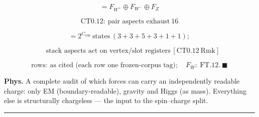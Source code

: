 \begin{theorem}
\[
= F_{W^+}\oplus F_{W^-}\oplus F_Z
\]

\[
\mathrm{CT0.12}:\ \text{pair aspects exhaust}\ 16
\]

\[
= 2^{C_{\mathrm{cap}}}\ \text{states}\ (3{+}3{+}5{+}3{+}1{+}1);
\]

\[
\quad\text{stack aspects act on vertex/slot registers}\ [\mathrm{CT0.12\ Rmk}]
\]

\[
\text{rows}:\ \text{as cited (each row one frozen-corpus tag)};\quad F_W:\ \mathrm{FT.12}.\ \blacksquare
\]

\textbf{Phys.} A complete audit of which forces can carry an independently readable charge: only EM (boundary-readable), gravity and Higgs (as mass). Everything else is structurally chargeless — the input to the spin–charge split.

\vspace{2pt}\noindent\rule{\textwidth}{0.4pt}\vspace{2pt}

\end{theorem}

